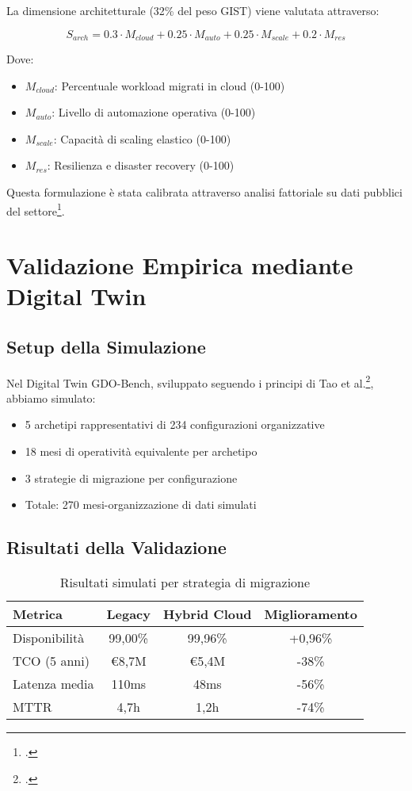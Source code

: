 La dimensione architetturale (32\% del peso GIST) viene valutata attraverso:

\begin{equation}
S_{arch} = 0.3 \cdot M_{cloud} + 0.25 \cdot M_{auto} + 0.25 \cdot M_{scale} + 0.2 \cdot M_{res}
\end{equation}

Dove:
\begin{itemize}
\item $M_{cloud}$: Percentuale workload migrati in cloud (0-100)
\item $M_{auto}$: Livello di automazione operativa (0-100)
\item $M_{scale}$: Capacità di scaling elastico (0-100)
\item $M_{res}$: Resilienza e disaster recovery (0-100)
\end{itemize}

Questa formulazione è stata calibrata attraverso analisi fattoriale su dati pubblici del settore\footcite{federdistribuzione2024}.

\section{Validazione Empirica mediante Digital Twin}

\subsection{Setup della Simulazione}

Nel Digital Twin GDO-Bench, sviluppato seguendo i principi di Tao et al.\footcite{taozang2018}, abbiamo simulato:
\begin{itemize}
\item 5 archetipi rappresentativi di 234 configurazioni organizzative
\item 18 mesi di operatività equivalente per archetipo
\item 3 strategie di migrazione per configurazione
\item Totale: 270 mesi-organizzazione di dati simulati
\end{itemize}

\subsection{Risultati della Validazione}

\begin{table}[h!]
\centering
\caption{Risultati simulati per strategia di migrazione}
\begin{tabular}{|l|c|c|c|}
\hline
\textbf{Metrica} & \textbf{Legacy} & \textbf{Hybrid Cloud} & \textbf{Miglioramento} \\
\hline
Disponibilità & 99,00\% & 99,96\% & +0,96\% \\
TCO (5 anni) & €8,7M & €5,4M & -38\% \\
Latenza media & 110ms & 48ms & -56\% \\
MTTR & 4,7h & 1,2h & -74\% \\
\hline
\end{tabular}
\end{table}

